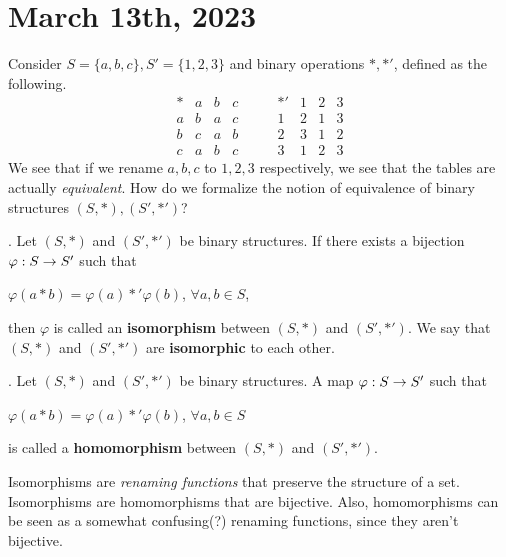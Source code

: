\section*{March 13th, 2023}


Consider \(S = \{a, b, c\}, S' = \{1, 2, 3\}\) and binary operations \(*, *'\), defined as the following.
\[
    \begin{array}{c|ccc}
        * & a & b & c \\ \hline
        a & b & a & c \\
        b & c & a & b \\
        c & a & b & c
    \end{array}
    \qquad
    \begin{array}{c|ccc}
        *' & 1 & 2 & 3 \\ \hline
        1  & 2 & 1 & 3 \\
        2  & 3 & 1 & 2 \\
        3  & 1 & 2 & 3
    \end{array}
\]
We see that if we rename \(a, b, c\) to \(1, 2, 3\) respectively, we see that the tables are actually \textit{equivalent}. How do we formalize the notion of equivalence of binary structures \((S, *), (S', *')\)?

.  Let \((S, *)\) and \((S', *')\) be binary structures. If there exists a bijection \(\varphi: S \rightarrow S'\) such that
\begin{center}
    \(\varphi(a * b) = \varphi(a) *' \varphi(b)\), \quad \(\forall a, b \in S\),
\end{center}
then \(\varphi\) is called an \textbf{isomorphism} between \((S, *)\) and \((S', *')\). We say that \((S, *)\) and \((S', *')\) are \textbf{isomorphic} to each other.

.  Let \((S, *)\) and \((S', *')\) be binary structures. A map \(\varphi: S \rightarrow S'\) such that
\begin{center}
    \(\varphi(a * b) = \varphi(a) *' \varphi(b)\), \quad \(\forall a, b \in S\)
\end{center}
is called a \textbf{homomorphism} between \((S, *)\) and \((S', *')\).

\rmk Isomorphisms are \textit{renaming functions} that preserve the structure of a set. Isomorphisms are homomorphisms that are bijective. Also, homomorphisms can be seen as a somewhat confusing(?) renaming functions, since they aren't bijective.

